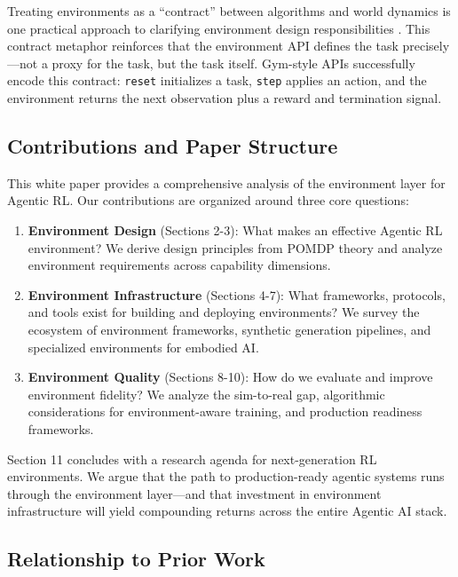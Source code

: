 Treating environments as a ``contract'' between algorithms and world dynamics is one practical approach to clarifying environment design responsibilities \citep{abaka2025designing}. This contract metaphor reinforces that the environment API defines the task precisely—not a proxy for the task, but the task itself. Gym-style APIs successfully encode this contract: \texttt{reset} initializes a task, \texttt{step} applies an action, and the environment returns the next observation plus a reward and termination signal.

\subsection{Contributions and Paper Structure}

This white paper provides a comprehensive analysis of the environment layer for Agentic RL. Our contributions are organized around three core questions:

\begin{enumerate}
    \item \textbf{Environment Design} (Sections 2-3): What makes an effective Agentic RL environment? We derive design principles from POMDP theory and analyze environment requirements across capability dimensions.
    
    \item \textbf{Environment Infrastructure} (Sections 4-7): What frameworks, protocols, and tools exist for building and deploying environments? We survey the ecosystem of environment frameworks, synthetic generation pipelines, and specialized environments for embodied AI.
    
    \item \textbf{Environment Quality} (Sections 8-10): How do we evaluate and improve environment fidelity? We analyze the sim-to-real gap, algorithmic considerations for environment-aware training, and production readiness frameworks.
\end{enumerate}

Section 11 concludes with a research agenda for next-generation RL environments. We argue that the path to production-ready agentic systems runs through the environment layer---and that investment in environment infrastructure will yield compounding returns across the entire Agentic AI stack.

\subsection{Relationship to Prior Work}


